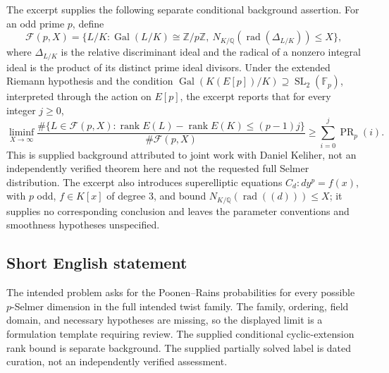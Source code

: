 \documentclass[11pt]{article}
\newcommand{\Z}{\mathbb{Z}}
\newcommand{\Q}{\mathbb{Q}}
\newcommand{\F}{\mathbb{F}}
\begin{document}
The excerpt supplies the following separate conditional background assertion. For an odd prime \(p\), define
\[
\mathcal F(p,X)=\{L/K:\operatorname{Gal}(L/K)\cong\Z/p\Z,
\ N_{K/\Q}(\operatorname{rad}(\Delta_{L/K}))\leq X\},
\]
where \(\Delta_{L/K}\) is the relative discriminant ideal and the radical of a nonzero integral ideal is the product of its distinct prime ideal divisors. Under the extended Riemann hypothesis and the condition
\(\operatorname{Gal}(K(E[p])/K)\supseteq\operatorname{SL}_2(\F_p)\), interpreted through the action on \(E[p]\), the excerpt reports that for every integer \(j\geq0\),
\[
\liminf_{X\to\infty}
\frac{\#\{L\in\mathcal F(p,X):
\operatorname{rank}E(L)-\operatorname{rank}E(K)\leq(p-1)j\}}
{\#\mathcal F(p,X)}
\geq\sum_{i=0}^{j}\operatorname{PR}_p(i).
\]
This is supplied background attributed to joint work with Daniel Keliher, not an independently verified theorem here and not the requested full Selmer distribution. The excerpt also introduces superelliptic equations \(C_d:dy^p=f(x)\), with \(p\) odd, \(f\in K[x]\) of degree \(3\), and bound \(N_{K/\Q}(\operatorname{rad}((d)))\leq X\); it supplies no corresponding conclusion and leaves the parameter conventions and smoothness hypotheses unspecified.
\subsection{Short English statement}
The intended problem asks for the Poonen--Rains probabilities for every possible \(p\)-Selmer dimension in the full intended twist family. The family, ordering, field domain, and necessary hypotheses are missing, so the displayed limit is a formulation template requiring review. The supplied conditional cyclic-extension rank bound is separate background. The supplied partially solved label is dated curation, not an independently verified assessment.
\end{document}

